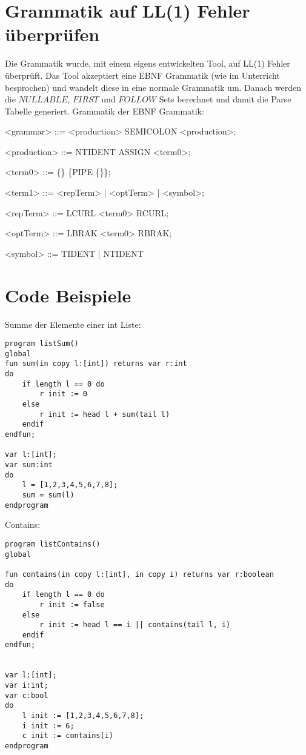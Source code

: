 \documentclass[a4paper,notitlepage,oneside]{scrartcl}
\begin{document}
\newpage
\section{Grammatik auf LL(1) Fehler überprüfen}
Die Grammatik wurde, mit einem eigens entwickelten Tool, auf LL(1) Fehler überprüft. Das Tool akzeptiert eine EBNF Grammatik (wie im Unterricht besprochen) und wandelt diese in eine normale Grammatik um. Danach werden die $NULLABLE$, $FIRST$ und $FOLLOW$ Sets berechnet und damit die Parse Tabelle generiert.
\newline
\newline
Grammatik der EBNF Grammatik:
\begin{grammar}
<grammar> ::= <production> {SEMICOLON <production>};

<production> ::= NTIDENT ASSIGN <term0>;

<term0> ::= \{<term1>\} \{PIPE \{<term1>\}\};

<term1> ::= <repTerm> | <optTerm> | <symbol>;

<repTerm> ::= LCURL <term0> RCURL;

<optTerm> ::= LBRAK <term0> RBRAK;

<symbol> ::= TIDENT | NTIDENT
\end{grammar}


\newpage
\section{Code Beispiele}
Summe der Elemente einer int Liste:
\begin{lstlisting}[language=iml, caption=Beispiel für die Berechnung der Summe der Element einer Liste in IML]
program listSum()
global
fun sum(in copy l:[int]) returns var r:int
do
	if length l == 0 do
		r init := 0
	else
		r init := head l + sum(tail l)
	endif
endfun;

var l:[int];
var sum:int
do
	l = [1,2,3,4,5,6,7,8];
	sum = sum(l)
endprogram
\end{lstlisting}

Contains:
\begin{lstlisting}[language=iml, caption=Listen Contains]
program listContains()
global

fun contains(in copy l:[int], in copy i) returns var r:boolean
do
	if length l == 0 do
		r init := false
	else
		r init := head l == i || contains(tail l, i)
	endif
endfun;


var l:[int];
var i:int;
var c:bool
do
	l init := [1,2,3,4,5,6,7,8];
	i init := 6;
	c init := contains(i)
endprogram

\end{lstlisting}
\end{document}
